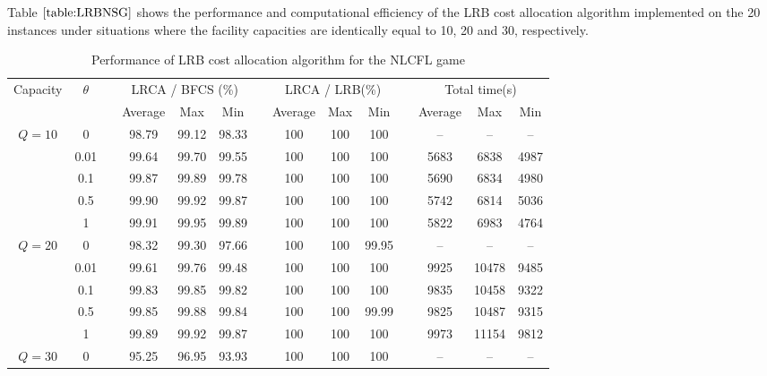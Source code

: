 \documentclass[ijoc,nonblindrev]{informs3} %
\begin{document}
Table $\ref{table:LRBNSG}$ shows the performance and computational efficiency of the LRB cost allocation algorithm implemented on the 20 instances under situations where the facility capacities are identically equal to 10, 20 and 30, respectively. 
\begin{table}[H]
\vspace{-2mm}
\centering
\tabcolsep=6pt
\small
\renewcommand\arraystretch{1.4}
\caption{\label{table:LRBNSG}Performance of LRB cost allocation algorithm for the NLCFL game}
\begin{tabular}[!h]{c c c c c c c c c c c c c c}
\hline
\multirow{2}{*}{Capacity} &\multirow{2}{*}{$\theta$} &\multicolumn{1}{c}{} & \multicolumn{3}{c}{LRCA / BFCS (\%)} &\multicolumn{1}{c}{} & \multicolumn{3}{c}{LRCA / LRB(\%)}  &\multicolumn{1}{c}{} & \multicolumn{3}{c}{Total time(s)}\\
\cline{4-6}
\cline{8-10}
\cline{12-14}
& & & Average & Max &Min	& & Average & Max &Min & & Average & Max &Min\\
\hline
\multirow{5}{*}{$Q=10$}
&0  &  &98.79	&99.12	&98.33	&	&100	&100	&100	&	&--	&--	&--\\

&0.01  &  &99.64	&99.70	&99.55	&	&100	&100	&100	&	&5683	&6838	&4987\\

&0.1  &  &99.87	&99.89	&99.78	&	&100	&100	&100	&	&5690	&6834	&4980\\

&0.5  &  &99.90	&99.92	&99.87	&	&100	&100	&100	&	&5742	&6814	&5036\\

&1  &  &99.91	&99.95	&99.89	&	&100	&100	&100	&	&5822	&6983	&4764\\
\hline
\multirow{5}{*}{$Q=20$}
&0  &  &98.32	&99.30	&97.66	&	&100	&100	&99.95	&	&--	&--	&--\\

&0.01  &  &99.61	&99.76	&99.48	&	&100	&100	&100	&	&9925	&10478	&9485\\

&0.1  &  &99.83	&99.85	&99.82	&	&100	&100	&100	&	&9835	&10458	&9322\\

&0.5  &  &99.85	&99.88	&99.84	&	&100	&100	&99.99	&	&9825	&10487	&9315\\

&1  &  &99.89	&99.92	&99.87	&	&100	&100	&100	&	&9973	&11154	&9812\\
\hline
\multirow{5}{*}{$Q=30$}
&0  &  &95.25	&96.95	&93.93	&	&100	&100	&100	&	&--	&--	&--\\


\end{tabular}
\end{table}
\end{document}
